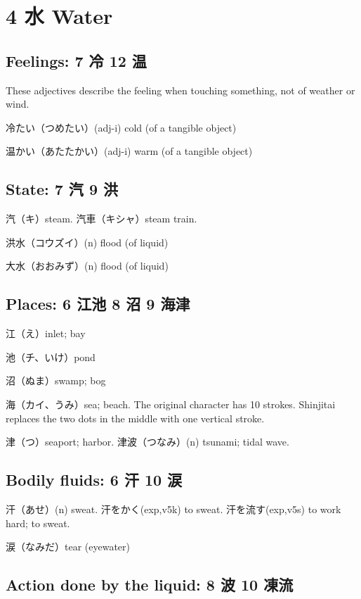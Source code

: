 \section{4 水 Water}

\subsection{Feelings: 7 冷 12 温}

These adjectives describe the feeling when
touching something, not of weather or wind.

冷たい（つめたい）(adj-i) cold (of a tangible object)

温かい（あたたかい）(adj-i) warm (of a tangible object)

\subsection{State: 7 汽 9 洪}

汽（キ）steam.
汽車（キシャ）steam train.

洪水（コウズイ）(n) flood (of liquid)

大水（おおみず）(n) flood (of liquid)

\subsection{Places: 6 江池 8 沼 9 海津}

江（え）inlet; bay

池（チ、いけ）pond

沼（ぬま）swamp; bog

海（カイ、うみ）sea; beach.
The original character has 10 strokes.
Shinjitai replaces the two dots in the middle
with one vertical stroke.

津（つ）seaport; harbor.
津波（つなみ）(n) tsunami; tidal wave.

\subsection{Bodily fluids: 6 汗 10 涙}

汗（あせ）(n) sweat.
汗をかく(exp,v5k) to sweat.
汗を流す(exp,v5s) to work hard; to sweat.

涙（なみだ）tear (eyewater)

\subsection{Action done by the liquid: 8 波 10 凍流}

